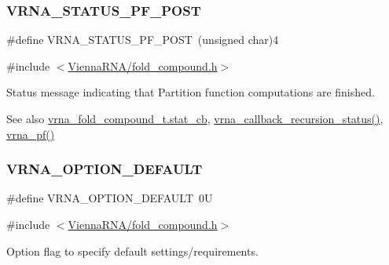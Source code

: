 \subsubsection{\texorpdfstring{V\+R\+N\+A\+\_\+\+S\+T\+A\+T\+U\+S\+\_\+\+P\+F\+\_\+\+P\+O\+ST}{VRNA\_STATUS\_PF\_POST}}
{\footnotesize\ttfamily \#define V\+R\+N\+A\+\_\+\+S\+T\+A\+T\+U\+S\+\_\+\+P\+F\+\_\+\+P\+O\+ST~(unsigned char)4}



{\ttfamily \#include $<$\mbox{\hyperlink{fold__compound_8h}{Vienna\+R\+N\+A/fold\+\_\+compound.\+h}}$>$}



Status message indicating that Partition function computations are finished. 

\begin{DoxySeeAlso}{See also}
\mbox{\hyperlink{group__fold__compound_a87a83f6795b569000efcbe65acc3dd81}{vrna\+\_\+fold\+\_\+compound\+\_\+t.\+stat\+\_\+cb}}, \mbox{\hyperlink{group__fold__compound_gac86036fa8cad1108832335063243cdc8}{vrna\+\_\+callback\+\_\+recursion\+\_\+status()}}, \mbox{\hyperlink{group__pf__fold_ga29e256d688ad221b78d37f427e0e99bc}{vrna\+\_\+pf()}} 
\end{DoxySeeAlso}
\mbox{\label{group__fold__compound_gacea5b7ee6181c485f36e2afa0e9089e4}} 
\subsubsection{\texorpdfstring{V\+R\+N\+A\+\_\+\+O\+P\+T\+I\+O\+N\+\_\+\+D\+E\+F\+A\+U\+LT}{VRNA\_OPTION\_DEFAULT}}
{\footnotesize\ttfamily \#define V\+R\+N\+A\+\_\+\+O\+P\+T\+I\+O\+N\+\_\+\+D\+E\+F\+A\+U\+LT~0U}



{\ttfamily \#include $<$\mbox{\hyperlink{fold__compound_8h}{Vienna\+R\+N\+A/fold\+\_\+compound.\+h}}$>$}



Option flag to specify default settings/requirements. 

\mbox{\label{group__fold__compound_gae63be9127fe7dcc1f9bb14f5bb1064ee}} 

